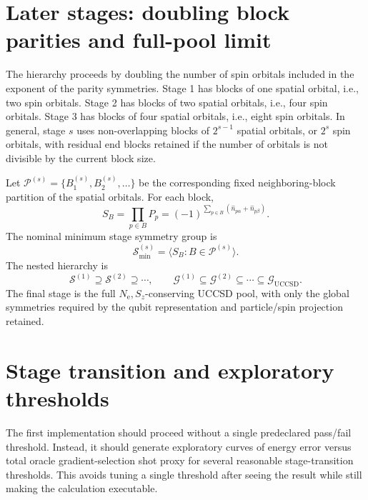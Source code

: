 \documentclass[11pt]{article}
\newcommand{\nelec}{N_{\mathrm e}}
\newcommand{\sz}{S_z}
\newcommand{\uccsd}{\mathcal G_{\mathrm{UCCSD}}}
\begin{document}
\section{Later stages: doubling block parities and full-pool limit}

The hierarchy proceeds by doubling the number of spin orbitals included in the exponent of the parity symmetries. Stage 1 has blocks of one spatial orbital, i.e., two spin orbitals. Stage 2 has blocks of two spatial orbitals, i.e., four spin orbitals. Stage 3 has blocks of four spatial orbitals, i.e., eight spin orbitals. In general, stage $s$ uses non-overlapping blocks of $2^{s-1}$ spatial orbitals, or $2^s$ spin orbitals, with residual end blocks retained if the number of orbitals is not divisible by the current block size.

Let $\mathcal P^{(s)}=\{B_1^{(s)},B_2^{(s)},\ldots\}$ be the corresponding fixed neighboring-block partition of the spatial orbitals. For each block,
\begin{equation}
    S_B=\prod_{p\in B}P_p
    =(-1)^{\sum_{p\in B}(\hat n_{p\alpha}+\hat n_{p\beta})}.
\end{equation}
The nominal minimum stage symmetry group is
\begin{equation}
    \mathcal S_{\min}^{(s)}=\langle S_B:B\in\mathcal P^{(s)}\rangle.
\end{equation}
The nested hierarchy is
\begin{equation}
    \mathcal S^{(1)}\supseteq\mathcal S^{(2)}\supseteq\cdots,
    \qquad
    \mathcal G^{(1)}\subseteq\mathcal G^{(2)}\subseteq\cdots\subseteq\uccsd.
\end{equation}
The final stage is the full $\nelec,\sz$-conserving UCCSD pool, with only the global symmetries required by the qubit representation and particle/spin projection retained.

\section{Stage transition and exploratory thresholds}
\label{sec:transition}

The first implementation should proceed without a single predeclared pass/fail threshold. Instead, it should generate exploratory curves of energy error versus total oracle gradient-selection shot proxy for several reasonable stage-transition thresholds. This avoids tuning a single threshold after seeing the result while still making the calculation executable.
\end{document}
